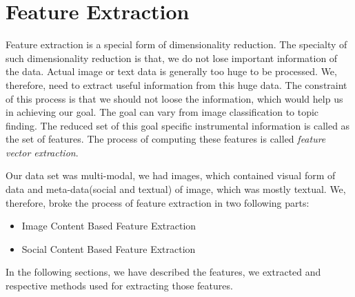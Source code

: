
\chapter{Feature Extraction} %
\label{Feature Extraction} %
Feature extraction is a special form of dimensionality reduction. The specialty of such dimensionality reduction is that, we do not lose important information of the data. Actual image or text data is generally too huge to be processed. We, therefore, need to extract useful information from this huge data. The constraint of this process is that we should not loose the information, which would help us in achieving our goal. The goal can vary from image classification to topic finding. The reduced set of this goal specific instrumental information is called as the set of features. The process of computing these features is called \emph{feature vector extraction}.

Our data set was multi-modal, we had images, which contained visual form of data and meta-data(social and textual) of image, which was mostly textual. We, therefore, broke the process of feature extraction in two following parts:
\begin{itemize}
\item Image Content Based Feature Extraction
\item Social Content Based Feature Extraction
\end{itemize}
In the following sections, we have described the features, we extracted and respective methods used for extracting those features.


